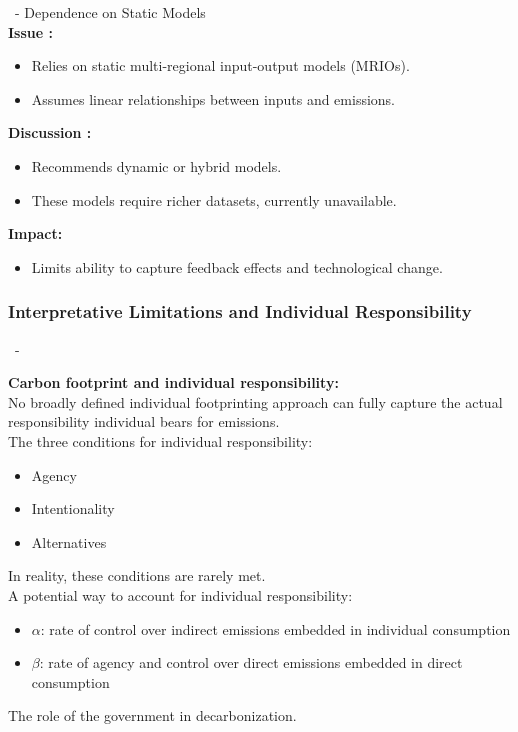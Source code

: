 \documentclass[10pt]{beamer}
\begin{document}
\begin{frame}{\subsecname \  - \subsubsecname}
    Dependence on Static Models \\
    \textbf{Issue :}
    \begin{itemize}
        \item Relies on static multi-regional input-output models (MRIOs).
        \item Assumes linear relationships between inputs and emissions.
    \end{itemize}
    \vspace{0.3cm}
    \textbf{Discussion :}
    \begin{itemize}
        \item Recommends dynamic or hybrid models.
        \item These models require richer datasets, currently unavailable.
    \end{itemize}
    \vspace{0.3cm}
    \textbf{Impact:}
    \begin{itemize}
        \item Limits ability to capture feedback effects and technological change.
    \end{itemize}
\end{frame}

\subsubsection{Interpretative Limitations and Individual Responsibility}
\begin{frame}{\subsecname \  - \subsubsecname}

    \textbf{Carbon footprint and individual responsibility:} \\ 
    No broadly defined individual footprinting approach can fully capture the actual responsibility individual bears for emissions. \\

    The three conditions for individual responsibility:
    \begin{itemize}
        \item Agency
        \item Intentionality
        \item Alternatives
    \end{itemize}

    In reality, these conditions are rarely met. \\

    A potential way to account for individual responsibility:
    \begin{itemize}
        \item $\alpha$: rate of control over indirect emissions embedded in individual consumption
        \item $\beta$: rate of agency and control over direct emissions embedded in direct consumption 
    \end{itemize}

    \vspace{5pt}
    The role of the government in decarbonization.
\end{frame}
\end{document}
